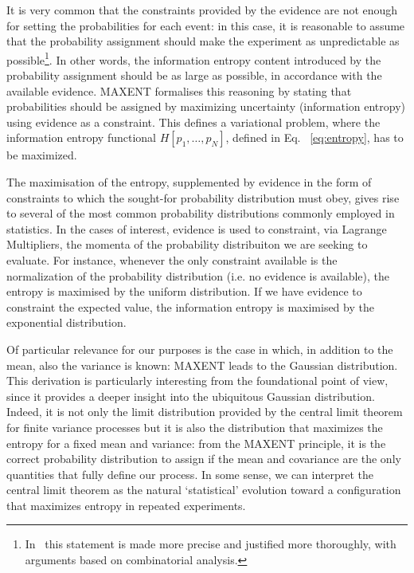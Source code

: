 \documentclass[epj,nopacs]{svjour}
\begin{document}
It is very common that the constraints provided by the evidence are not enough for setting the probabilities for each event: in this case, it is reasonable to assume that the probability assignment should make the experiment as unpredictable as possible\footnote{
In~\cite{Jaynes_MAXENT} this statement is made more precise and justified more thoroughly, with arguments based on combinatorial analysis.
}.
In other words, the information entropy content introduced by the probability assignment should be as large as possible, in accordance with the available evidence. MAXENT formalises this reasoning by stating that probabilities should be assigned by maximizing uncertainty (information entropy) using evidence as a constraint. 
This defines a variational problem, where the information entropy functional $H\left[p_1, \dots, p_N\right]$, defined in Eq. ~\eqref{eq:entropy}, has to be maximized. 

The maximisation of the entropy, supplemented by evidence in the form of constraints to which the sought-for probability distribution must obey, gives rise to several of the most common probability distributions commonly employed in statistics. In the cases of interest, evidence is used to constraint, via Lagrange Multipliers, the momenta of the probability distribuiton we are seeking to evaluate. For instance, whenever the only constraint available is the normalization of the probability distribution (i.e. no evidence is available), the entropy is maximised by the uniform distribution. If we have evidence to constraint the expected value, the information entropy is maximised by the exponential distribution.

Of particular relevance for our purposes is the case in which, in addition to the mean, also the variance is known: MAXENT leads to the Gaussian distribution. 
This derivation is particularly interesting from the foundational point of view, since it provides a deeper insight into the ubiquitous Gaussian distribution.
Indeed, it is not only the limit distribution provided by the central limit theorem for finite variance processes but it is also the distribution that maximizes the entropy for a fixed mean and variance: from the MAXENT principle, it is the correct probability distribution to assign if the mean and covariance are the only quantities that fully define our process. In some sense, we can interpret the central limit theorem as the natural `statistical' evolution toward a configuration that maximizes entropy in repeated experiments.
\end{document}
